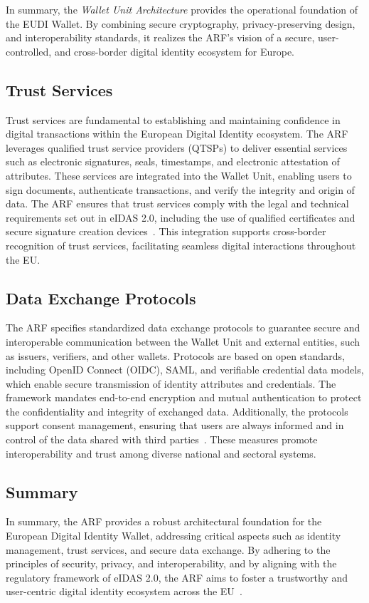 \documentclass[sigconf,balance,nonacm,authordraft]{acmart}
\begin{document}
In summary, the \textit{Wallet Unit Architecture} provides the operational foundation of the EUDI Wallet. By combining secure cryptography, privacy-preserving design, and interoperability standards, it realizes the ARF’s vision of a secure, user-controlled, and cross-border digital identity ecosystem for Europe.

\subsection{Trust Services}
Trust services are fundamental to establishing and maintaining confidence in digital transactions within the European Digital Identity ecosystem. The ARF leverages qualified trust service providers (QTSPs) to deliver essential services such as electronic signatures, seals, timestamps, and electronic attestation of attributes. These services are integrated into the Wallet Unit, enabling users to sign documents, authenticate transactions, and verify the integrity and origin of data. The ARF ensures that trust services comply with the legal and technical requirements set out in eIDAS 2.0, including the use of qualified certificates and secure signature creation devices~\cite{EU_ARF2024,EU_eIDAS2024}. This integration supports cross-border recognition of trust services, facilitating seamless digital interactions throughout the EU.

\subsection{Data Exchange Protocols}
The ARF specifies standardized data exchange protocols to guarantee secure and interoperable communication between the Wallet Unit and external entities, such as issuers, verifiers, and other wallets. Protocols are based on open standards, including OpenID Connect (OIDC), SAML, and verifiable credential data models, which enable secure transmission of identity attributes and credentials. The framework mandates end-to-end encryption and mutual authentication to protect the confidentiality and integrity of exchanged data. Additionally, the protocols support consent management, ensuring that users are always informed and in control of the data shared with third parties~\cite{EU_ARF2024}. These measures promote interoperability and trust among diverse national and sectoral systems.

\subsection{Summary}
In summary, the ARF provides a robust architectural foundation for the European Digital Identity Wallet, addressing critical aspects such as identity management, trust services, and secure data exchange. By adhering to the principles of security, privacy, and interoperability, and by aligning with the regulatory framework of eIDAS 2.0, the ARF aims to foster a trustworthy and user-centric digital identity ecosystem across the EU~\cite{EU_ARF2024,EU_eIDAS2024}.
\end{document}
